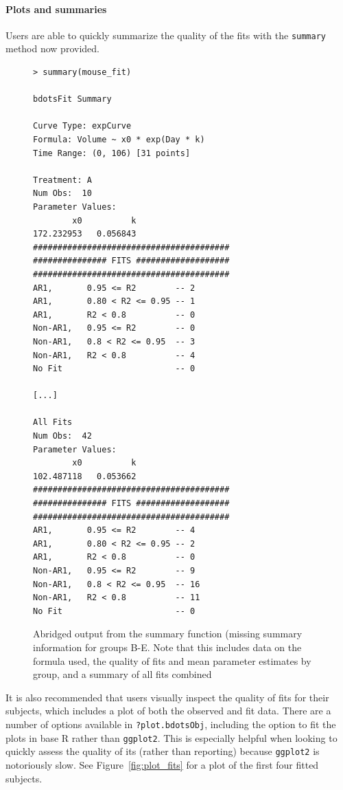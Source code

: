 \documentclass{article}
\newcommand{\xt}{\texttt}%
\begin{document}
\paragraph{Plots and summaries}

Users are able to quickly summarize the quality of the fits with the \xt{summary} method now provided. 

\begin{singlespace}
\begin{figure}[H]
\centering
\begin{BVerbatim}
> summary(mouse_fit)

bdotsFit Summary

Curve Type: expCurve 
Formula: Volume ~ x0 * exp(Day * k) 
Time Range: (0, 106) [31 points]

Treatment: A 
Num Obs:  10 
Parameter Values: 
        x0          k 
172.232953   0.056843 
########################################
############### FITS ###################
########################################
AR1,       0.95 <= R2        -- 2 
AR1,       0.80 < R2 <= 0.95 -- 1 
AR1,       R2 < 0.8          -- 0 
Non-AR1,   0.95 <= R2        -- 0 
Non-AR1,   0.8 < R2 <= 0.95  -- 3 
Non-AR1,   R2 < 0.8          -- 4 
No Fit                       -- 0 

[...]

All Fits 
Num Obs:  42 
Parameter Values: 
        x0          k 
102.487118   0.053662 
########################################
############### FITS ###################
########################################
AR1,       0.95 <= R2        -- 4 
AR1,       0.80 < R2 <= 0.95 -- 2 
AR1,       R2 < 0.8          -- 0 
Non-AR1,   0.95 <= R2        -- 9 
Non-AR1,   0.8 < R2 <= 0.95  -- 16 
Non-AR1,   R2 < 0.8          -- 11 
No Fit                       -- 0 
\end{BVerbatim}
\caption{Abridged output from the summary function (missing summary information for groups B-E. Note that this includes data on the formula used, the quality of fits and mean parameter estimates by group, and a summary of all fits combined}
\end{figure}
\end{singlespace}

It is also recommended that users visually inspect the quality of fits for their subjects, which includes a plot of both the observed and fit data. There are a number of options available in \xt{?plot.bdotsObj}, including the option to fit the plots in base R rather than \xt{ggplot2}. This is especially helpful when looking to quickly assess the quality of its (rather than reporting) because \xt{ggplot2} is notoriously slow. See Figure~\ref{fig:plot_fits} for a plot of the first four fitted subjects.
\end{document}
